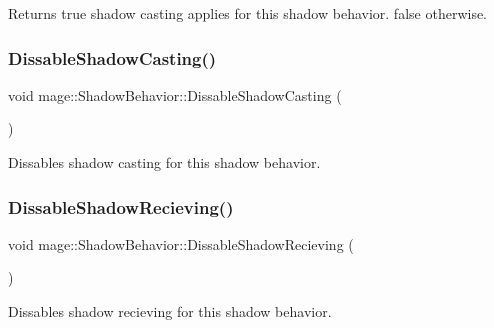 \begin{DoxyReturn}{Returns}
{\ttfamily true} shadow casting applies for this shadow behavior. {\ttfamily false} otherwise. 
\end{DoxyReturn}
\hypertarget{structmage_1_1_shadow_behavior_ad0b5b458bcc3fab7df549efc5b4bbd51}{}\label{structmage_1_1_shadow_behavior_ad0b5b458bcc3fab7df549efc5b4bbd51} 
\subsubsection{\texorpdfstring{Dissable\+Shadow\+Casting()}{DissableShadowCasting()}}
{\footnotesize\ttfamily void mage\+::\+Shadow\+Behavior\+::\+Dissable\+Shadow\+Casting (\begin{DoxyParamCaption}{ }\end{DoxyParamCaption})\hspace{0.3cm}{\ttfamily [noexcept]}}

Dissables shadow casting for this shadow behavior. \hypertarget{structmage_1_1_shadow_behavior_a7ed68217124fdb36f3f96507f30cfad1}{}\label{structmage_1_1_shadow_behavior_a7ed68217124fdb36f3f96507f30cfad1} 
\subsubsection{\texorpdfstring{Dissable\+Shadow\+Recieving()}{DissableShadowRecieving()}}
{\footnotesize\ttfamily void mage\+::\+Shadow\+Behavior\+::\+Dissable\+Shadow\+Recieving (\begin{DoxyParamCaption}{ }\end{DoxyParamCaption})\hspace{0.3cm}{\ttfamily [noexcept]}}

Dissables shadow recieving for this shadow behavior. \hypertarget{structmage_1_1_shadow_behavior_ac8ca2e4c045206492c1ae55eefd46339}{}\label{structmage_1_1_shadow_behavior_ac8ca2e4c045206492c1ae55eefd46339} 
